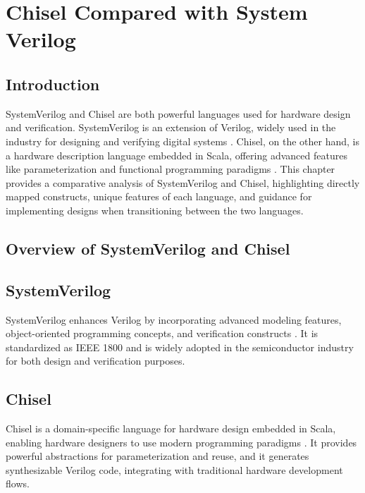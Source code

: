 \section{Chisel Compared with System Verilog}


\subsection{Introduction}


SystemVerilog and Chisel are both powerful languages used for hardware design and verification. SystemVerilog is an extension of Verilog, widely used in the industry for designing and verifying digital systems \cite{ieee1800-2017}. Chisel, on the other hand, is a hardware description language embedded in Scala, offering advanced features like parameterization and functional programming paradigms \cite{bachrach2012chisel}. This chapter provides a comparative analysis of SystemVerilog and Chisel, highlighting directly mapped constructs, unique features of each language, and guidance for implementing designs when transitioning between the two languages.

\subsection{Overview of SystemVerilog and Chisel}

\subsection{SystemVerilog}

SystemVerilog enhances Verilog by incorporating advanced modeling features, object-oriented programming concepts, and verification constructs \cite{baker2010systemverilog}. It is standardized as IEEE 1800 and is widely adopted in the semiconductor industry for both design and verification purposes.

\subsection{Chisel}

Chisel is a domain-specific language for hardware design embedded in Scala, enabling hardware designers to use modern programming paradigms \cite{chisel-doc}. It provides powerful abstractions for parameterization and reuse, and it generates synthesizable Verilog code, integrating with traditional hardware development flows.

